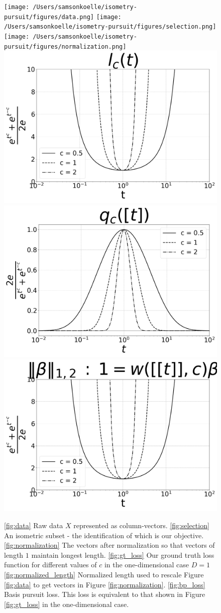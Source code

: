 
\begin{figure}[t]
\centering
{\texttt{[image: /Users/samsonkoelle/isometry-pursuit/figures/data.png]}}
{\texttt{[image: /Users/samsonkoelle/isometry-pursuit/figures/selection.png]}}
{\texttt{[image: /Users/samsonkoelle/isometry-pursuit/figures/normalization.png]}}
{\includegraphics[width = .32\textwidth]{../figures/Figure_1a_bw.png}}
{\includegraphics[width = .32\textwidth]{../figures/Figure_1b_bw.png}}
{\includegraphics[width = .32\textwidth]{../figures/Figure_1c_bw.png}}

\caption{\ref{fig:data} Raw data $X$ represented as column-vectors.
 \ref{fig:selection} An isometric subset - the identification of which is our objective.
 \ref{fig:normalization} The vectors after normalization so that vectors of length $1$ maintain longest length.
 \ref{fig:gt_loss} Our ground truth loss function for different values of $c$ in the one-dimensional case $D = 1$
 \ref{fig:normalized_length} Normalized length used to rescale Figure \ref{fig:data} to get vectors in Figure \ref{fig:normalization}.
 \ref{fig:bp_loss} Basis pursuit loss. 
This loss is equivalent to that shown in Figure \ref{fig:gt_loss} in the one-dimensional case.
\label{fig:losses}
}
\end{figure}

